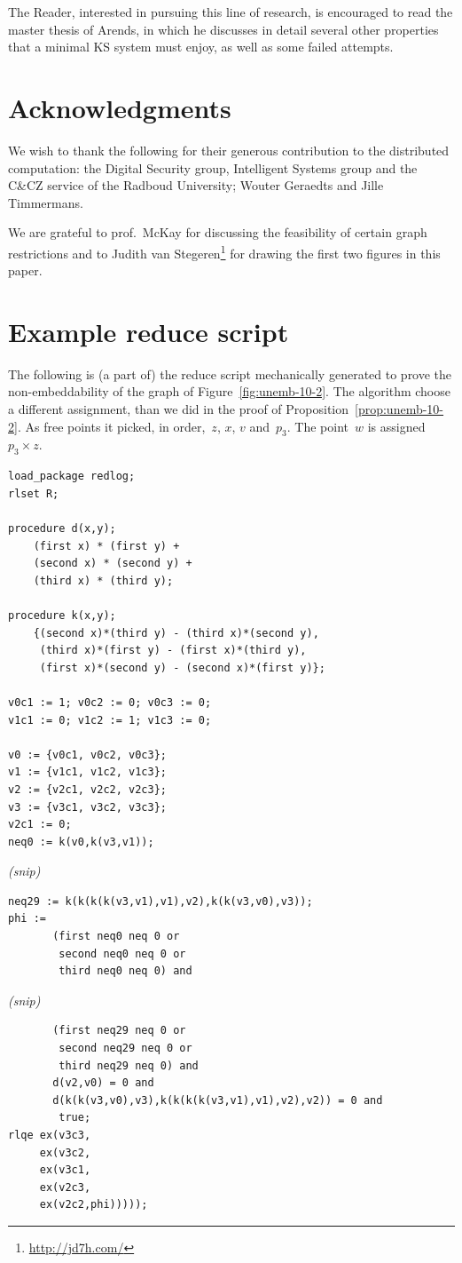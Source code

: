 \documentclass[adraft,copyright,creativecommons]{eptcs}
\newcounter{main}
\theoremstyle{definition}
\theoremstyle{remark}
\begin{document}
The Reader, interested in pursuing this line of research,
is encouraged to read the master thesis\cite{a09} of Arends,
in which he discusses in detail several other
properties that a minimal KS system must enjoy, as well as
some failed attempts.

\section{Acknowledgments}
We wish to thank the following for their generous contribution to the
distributed computation:
    the Digital Security group, Intelligent Systems group
    and the C\&CZ service of the Radboud University;
    Wouter Geraedts and
    Jille Timmermans.

We are grateful to prof.~McKay for discussing
the feasibility of certain graph restrictions and
to Judith van Stegeren\footnote{\url{http://jd7h.com/}}
for drawing the first two figures in this paper.

\clearpage
\appendix
\section{Example reduce script}\label{adx:unemb-10-2}
The following is (a part of) the reduce script mechanically generated
to prove the non-embeddability of the graph of Figure~\ref{fig:unemb-10-2}.
The algorithm choose a different assignment, than we did in the
proof of Proposition~\ref{prop:unemb-10-2}.
As free points it picked, in order,~$z$, $x$, $v$ and~$p_3$.
The point~$w$ is assigned~$p_3 \times z$.
\begin{verbatim}
load_package redlog;
rlset R;

procedure d(x,y);
    (first x) * (first y) +
    (second x) * (second y) +
    (third x) * (third y);

procedure k(x,y);
    {(second x)*(third y) - (third x)*(second y),
     (third x)*(first y) - (first x)*(third y),
     (first x)*(second y) - (second x)*(first y)};

v0c1 := 1; v0c2 := 0; v0c3 := 0;
v1c1 := 0; v1c2 := 1; v1c3 := 0;

v0 := {v0c1, v0c2, v0c3}; 
v1 := {v1c1, v1c2, v1c3}; 
v2 := {v2c1, v2c2, v2c3}; 
v3 := {v3c1, v3c2, v3c3}; 
v2c1 := 0;
neq0 := k(v0,k(v3,v1)); 
\end{verbatim}
\begin{center} \emph{(snip)} \end{center}
\begin{verbatim}
neq29 := k(k(k(k(v3,v1),v1),v2),k(k(v3,v0),v3)); 
phi := 
       (first neq0 neq 0 or
        second neq0 neq 0 or
        third neq0 neq 0) and 
\end{verbatim}
\begin{center} \emph{(snip)} \end{center}
\begin{verbatim}
       (first neq29 neq 0 or
        second neq29 neq 0 or
        third neq29 neq 0) and 
       d(v2,v0) = 0 and 
       d(k(k(v3,v0),v3),k(k(k(k(v3,v1),v1),v2),v2)) = 0 and 
        true;
rlqe ex(v3c3,
     ex(v3c2,
     ex(v3c1,
     ex(v2c3,
     ex(v2c2,phi)))));
\end{verbatim}


\clearpage
{}

\end{document}
